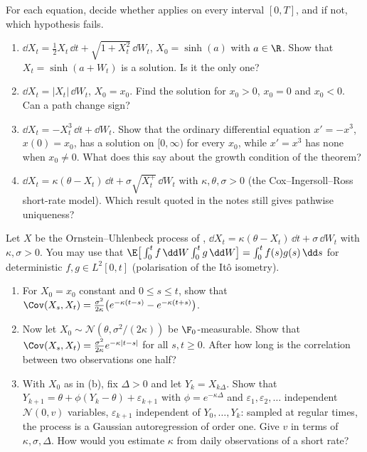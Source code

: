 
\begin{exercise}\label{ex:sde-check}
\easy For each equation, decide whether  applies on every
interval $[0,T]$, and if not, which hypothesis fails.
\begin{enumerate}[label=(\alph*)]
  \item $\dd X_t=\frac12X_t\,\dd t+\sqrt{1+X_t^2}\,\dd W_t$, $X_0=\sinh(a)$ with $a\in\R$.
    Show that $X_t=\sinh(a+W_t)$ is a solution. Is it the only one?
  \item $\dd X_t=|X_t|\,\dd W_t$, $X_0=x_0$. Find the solution for $x_0>0$, $x_0=0$ and
    $x_0<0$. Can a path change sign?
  \item $\dd X_t=-X_t^3\,\dd t+\dd W_t$. Show that the ordinary differential equation
    $x'=-x^3$, $x(0)=x_0$, has a solution on $[0,\infty)$ for every $x_0$, while $x'=x^3$ has
    none when $x_0\neq0$. What does this say about the growth condition of the theorem?
  \item $\dd X_t=\kappa(\theta-X_t)\,\dd t+\sigma\sqrt{X_t^+}\,\dd W_t$ with
    $\kappa,\theta,\sigma>0$ (the Cox--Ingersoll--Ross short-rate model). Which result
    quoted in the notes still gives pathwise uniqueness?
\end{enumerate}
\end{exercise}

\begin{exercise}\label{ex:sde-ou-cov}
\easy Let $X$ be the Ornstein--Uhlenbeck process of ,
$\dd X_t=\kappa(\theta-X_t)\,\dd t+\sigma\,\dd W_t$ with $\kappa,\sigma>0$. You may use that
$\E\big[\int_0^tf\,\dd W\int_0^tg\,\dd W\big]=\int_0^tf(s)g(s)\,\dd s$ for deterministic
$f,g\in L^2[0,t]$ (polarisation of the It\^o isometry).
\begin{enumerate}[label=(\alph*)]
  \item For $X_0=x_0$ constant and $0\le s\le t$, show that
    $\Cov(X_s,X_t)=\frac{\sigma^2}{2\kappa}\big(e^{-\kappa(t-s)}-e^{-\kappa(t+s)}\big)$.
  \item Now let $X_0\sim\mathcal N(\theta,\sigma^2/(2\kappa))$ be $\F_0$-measurable. Show that
    $\Cov(X_s,X_t)=\frac{\sigma^2}{2\kappa}e^{-\kappa|t-s|}$ for all $s,t\ge0$. After how long
    is the correlation between two observations one half?
  \item With $X_0$ as in (b), fix $\Delta>0$ and let $Y_k=X_{k\Delta}$. Show that
    $Y_{k+1}=\theta+\phi(Y_k-\theta)+\varepsilon_{k+1}$ with $\phi=e^{-\kappa\Delta}$ and
    $\varepsilon_1,\varepsilon_2,\dots$ independent $\mathcal N(0,v)$ variables, $\varepsilon_{k+1}$
    independent of $Y_0,\dots,Y_k$: sampled at regular times, the process is a Gaussian
    autoregression of order one. Give $v$ in terms of $\kappa,\sigma,\Delta$. How would you
    estimate $\kappa$ from daily observations of a short rate?
\end{enumerate}
\end{exercise}


